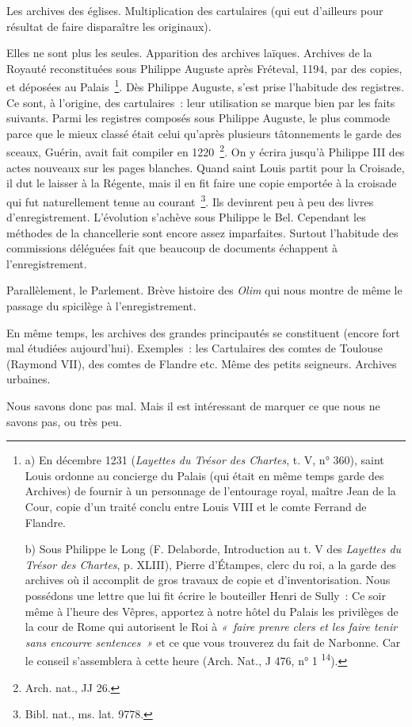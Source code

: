 \documentclass[french,twoside]{book} %
\begin{document}
\noindent Les archives des églises. Multiplication des cartulaires (qui eut d’ailleurs pour résultat de faire disparaître les originaux).\par
Elles ne sont plus les seules. Apparition des archives laïques. Archives de la Royauté reconstituées sous Philippe Auguste après Fréteval, 1194, par des copies, et déposées au Palais \footnote{ \noindent a) En décembre 1231 ({\itshape Layettes du Trésor des Chartes}, t. V, n° 360), saint Louis ordonne au concierge du Palais (qui était en même temps garde des Archives) de fournir à un personnage de l’entourage royal, maître Jean de la Cour, copie d’un traité conclu entre Louis VIII et le comte Ferrand de Flandre.\par
 b) Sous Philippe le Long (F. Delaborde, Introduction au t. V des {\itshape Layettes du Trésor des Chartes}, p. XLIII), Pierre d’Étampes, clerc du roi, a la garde des archives où il accomplit de gros travaux de copie et d’inventorisation. Nous possédons une lettre que lui fit écrire le bouteiller Henri de Sully : Ce soir même à l’heure des Vêpres, apportez à notre hôtel du Palais les privilèges de la cour de Rome qui autorisent le Roi à \emph{« faire prenre clers et les faire tenir sans encourre sentences »} et ce que vous trouverez du fait de Narbonne. Car le conseil s’assemblera à cette heure (Arch. Nat., J 476, n° 1 \textsuperscript{14}).
 }. Dès Philippe Auguste, s’est prise l’habitude des registres. Ce sont, à l’origine, des cartulaires : leur utilisation se marque bien par les faits suivants. Parmi les registres composés sous Philippe Auguste, le plus commode parce que le mieux classé était celui qu’après plusieurs tâtonnements le garde des sceaux, Guérin, avait fait compiler en 1220 \footnote{Arch. nat., JJ 26.}. On y écrira jusqu’à Philippe III des actes nouveaux sur les pages blanches. Quand saint Louis partit pour la Croisade, il dut le laisser à la Régente, mais il en fit faire une copie emportée à la croisade qui fut naturellement tenue au courant \footnote{Bibl. nat., ms. lat. 9778.}. Ils devinrent peu à peu des livres d’enregistrement. L’évolution s’achève sous Philippe le Bel. Cependant les méthodes de la chancellerie sont encore assez imparfaites. Surtout l’habitude des commissions déléguées fait que beaucoup de documents échappent à l’enregistrement.\par
\label{p3} Parallèlement, le Parlement. Brève histoire des {\itshape Olim} qui nous montre de même le passage du spicilège à l’enregistrement.\par
En même temps, les archives des grandes principautés se constituent (encore fort mal étudiées aujourd’hui). Exemples : les Cartulaires des comtes de Toulouse (Raymond VII), des comtes de Flandre etc. Même des petits seigneurs. Archives urbaines.\par
Nous savons donc pas mal. Mais il est intéressant de marquer ce que nous ne savons pas, ou très peu.\par
\end{document}
